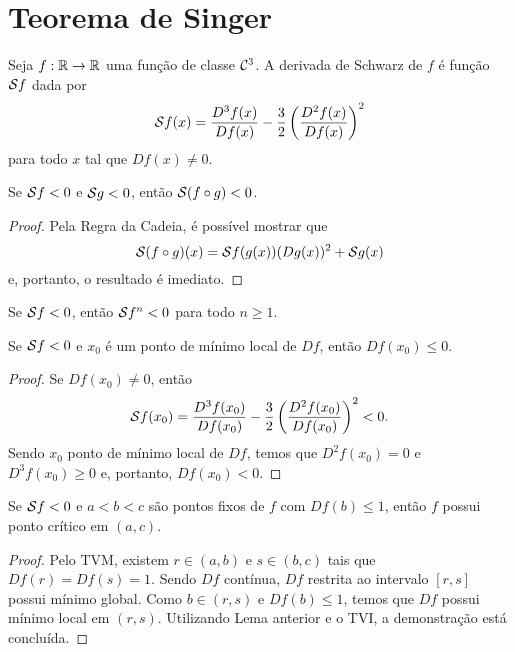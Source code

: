 \section{Teorema de Singer}

\begin{definition}
Seja $f: \mathbb{R} \to \mathbb{R}$ uma função de classe $\mathcal{C}^3$.
A derivada de Schwarz de $f$ é função $\mathcal{S} f$ dada por
$$\mathcal{S} f(x) = \frac{D^3 f(x)}{D f(x)} - \frac{3}{2} \left( \frac{D^2 f(x)}{D f(x)} \right)^2$$
para todo $x$ tal que $D f(x) \neq 0$.
\end{definition}

\begin{proposition}
Se $\mathcal{S} f < 0$ e $\mathcal{S} g < 0$, então $\mathcal{S} (f \circ g) < 0$.
\end{proposition}

\begin{proof}
Pela Regra da Cadeia, é possível mostrar que
$$\mathcal{S} (f \circ g)(x) = \mathcal{S} f(g(x))(D g(x))^2 + \mathcal{S} g(x)$$
e, portanto, o resultado é imediato.
\end{proof}

\begin{corollary}
Se $\mathcal{S} f < 0$, então $\mathcal{S} f^n < 0$ para todo $n \geq 1$.
\end{corollary}

\begin{lemma}
Se $\mathcal{S} f < 0$ e $x_0$ é um ponto de mínimo local de $D f$, então $D f(x_0) \leq 0$.
\end{lemma}

\begin{proof}
Se $D f(x_0) \neq 0$, então
$$\mathcal{S} f(x_0) = \frac{D^3 f(x_0)}{D f(x_0)} - \frac{3}{2} \left( \frac{D^2 f(x_0)}{D f(x_0)} \right)^2 < 0.$$
Sendo $x_0$ ponto de mínimo local de $D f$, temos que $D^2 f(x_0) = 0$ e $D^3 f(x_0) \geq 0$ e, portanto, $D f(x_0) < 0$. 
\end{proof}

\begin{lemma}
Se $\mathcal{S} f < 0$ e $a<b<c$ são pontos fixos de $f$ com $D f(b) \leq 1$, então $f$ possui ponto crítico em $(a, c)$.
\end{lemma}

\begin{proof}
Pelo TVM, existem $r \in (a,b)$ e $s \in (b,c)$  tais que $D f(r) = D f(s) = 1$.
Sendo $D f$ contínua, $D f$ restrita ao intervalo $[r,s]$ possui mínimo global.
Como $b \in (r,s)$ e $D f(b) \leq 1$, temos que $D f$ possui mínimo local em $(r,s)$.
Utilizando Lema anterior e o TVI, a demonstração está concluída.
\end{proof}

